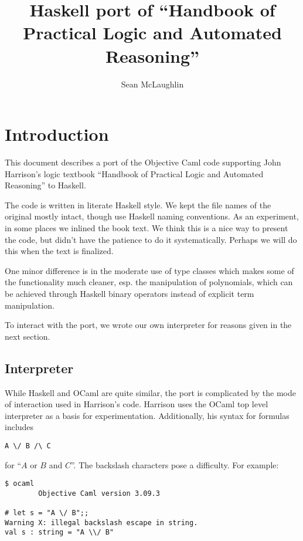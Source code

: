 \documentclass{article}
\begin{document}
 

\title{Haskell port of ``Handbook of Practical Logic and Automated Reasoning''} 
\author{Sean McLaughlin} 
\maketitle \pagestyle{plain} %

\section{Introduction}

This document describes a port of the Objective Caml code supporting
John Harrison's logic textbook ``Handbook of Practical Logic and
Automated Reasoning'' to Haskell. 

The code is written in literate Haskell style. We kept the file names
of the original mostly intact, though use Haskell naming conventions.
As an experiment, in some places we inlined the book text. We think
this is a nice way to present the code, but didn't have the patience
to do it systematically. Perhaps we will do this when the text is
finalized.

One minor difference is in the moderate use of type classes which
makes some of the functionality much cleaner, esp. the manipulation
of polynomials, which can be achieved through Haskell binary operators
instead of explicit term manipulation. 

To interact with the port, we wrote our own interpreter for reasons
given in the next section.

\subsection{Interpreter}
While Haskell and OCaml are quite
similar, the port is complicated by the mode of interaction used in
Harrison's code. Harrison uses the OCaml top level interpreter
as a basis for experimentation. Additionally, his syntax for
formulas includes

\begin{verbatim}
A \/ B /\ C 
\end{verbatim}  

\noindent for ``$A$ or $B$ and $C$''. The backslash characters pose a
difficulty. For example:

\begin{verbatim} 
$ ocaml
        Objective Caml version 3.09.3

# let s = "A \/ B";;
Warning X: illegal backslash escape in string.
val s : string = "A \\/ B"
\end{verbatim} 
\end{document}
